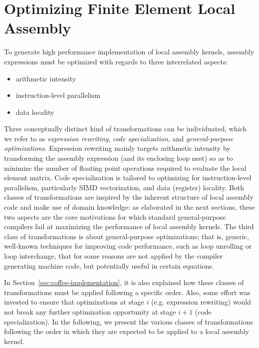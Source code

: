 
\section{Optimizing Finite Element Local Assembly}

To generate high performance implementation of local assembly kernels, assembly expressions must be optimized with regards to three interrelated aspects: 
\begin{itemize}
\item arithmetic intensity
\item instruction-level parallelism
\item data locality
\end{itemize}
Three conceptually distinct kind of transformations can be individuated, which we refer to as \textit{expression rewriting}, \textit{code specialization}, and \textit{general-purpose optimizations}. Expression rewriting mainly targets arithmetic intensity by transforming the assembly expression (and its enclosing loop nest) so as to minimize the number of floating point operations required to evaluate the local element matrix. Code specialization is tailored to optimizing for instruction-level parallelism, particularly SIMD vectorization, and data (register) locality. Both classes of transformations are inspired by the inherent structure of local assembly code and make use of domain knowledge: as elaborated in the next sections, these two aspects are the core motivations for which standard general-purpose compilers fail at maximizing the performance of local assembly kernels. The third class of transformations is about general-purpose optimizations; that is, generic, well-known techniques for improving code performance, such as loop unrolling or loop interchange, that for some reasons are not applied by the compiler generating machine code, but potentially useful in certain equations.

In Section~\ref{sec:coffee-implementation}, it is also explained how these classes of transformations must be applied following a specific order. Also, some effort was invested to ensure that optimizations at stage $i$ (e.g. expression rewriting) would not break any further optimization opportunity at stage $i+1$ (code specialization). In the following, we present the various classes of transformations following the order in which they are expected to be applied to a local assembly kernel.

